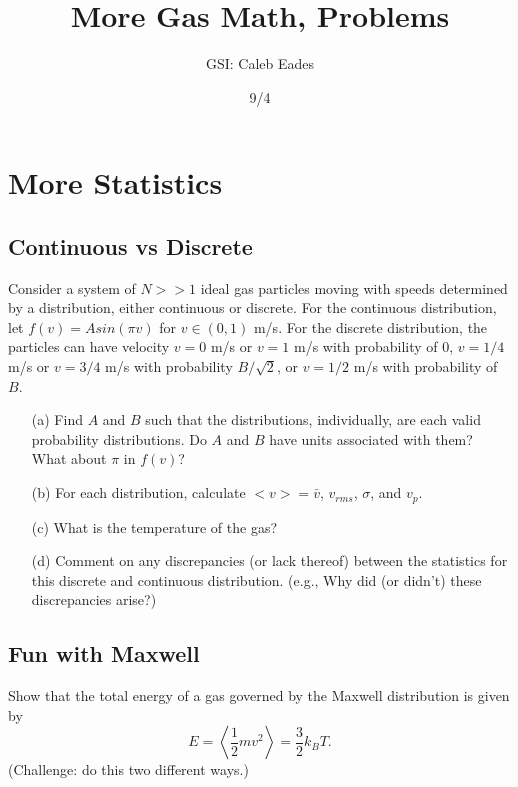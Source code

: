 \documentclass{article}
\begin{document}
	
\title{More Gas Math, Problems}
\author{GSI: Caleb Eades}
\date{9/4}
\maketitle

\section{More Statistics}

\subsection{Continuous vs Discrete}

Consider a system of $N>>1$ ideal gas particles moving with speeds determined by a distribution, either continuous or discrete. For the continuous distribution, let $f(v) = Asin(\pi v)$ for $v\in(0,1)$ m/s. For the discrete distribution, the particles can have velocity $v=0$ m/s or $v=1$ m/s with probability of $0$, $v=1/4$ m/s or $v=3/4$ m/s with probability $B/\sqrt{2}$, or $v=1/2$ m/s with probability of $B$.

\begin{itemize}
	\item[(a)] Find $A$ and $B$ such that the distributions, individually, are each valid probability distributions. Do $A$ and $B$ have units associated with them? What about $\pi$ in $f(v)$?
	\item[(b)] For each distribution, calculate $<v> = \bar{v}$, $v_{rms}$, $\sigma$, and $v_p$.
	\item[(c)] What is the temperature of the gas?
	\item[(d)] Comment on any discrepancies (or lack thereof) between the statistics for this discrete and continuous distribution. (e.g., Why did (or didn't) these discrepancies arise?)
\end{itemize}

\subsection{Fun with Maxwell}

Show that the total energy of a gas governed by the Maxwell distribution is given by
\begin{equation}
E = \left<\frac{1}{2}mv^2\right>=\frac{3}{2}k_BT.
\end{equation}
(Challenge: do this two different ways.)
\end{document}
